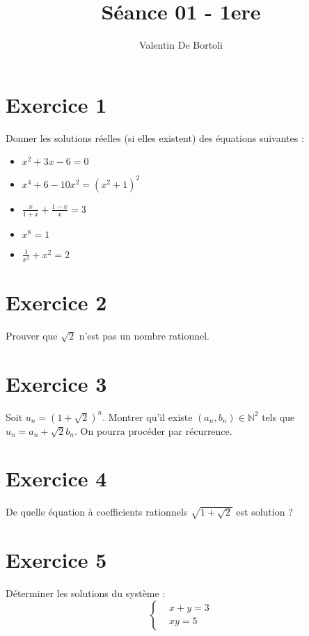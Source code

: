 \documentclass[10pt,a4paper]{article}
\title{Séance 01 - 1ere}
\author{Valentin De Bortoli}
\begin{document}
\maketitle
\section{Exercice 1}
Donner les solutions réelles (si elles existent) des équations
suivantes :
\begin{itemize}
\item $x^2 + 3x -6 = 0$
\item $x^4 + 6 -10x^2 = (x^2+1)^2$
\item $\frac{x}{1+x}  + \frac{1-x}{x} = 3$
\item $x^8 = 1$
\item $\frac{1}{x^2} + x^2 =2$
\end{itemize}

\section{Exercice 2}
Prouver que $\sqrt{2}$ n'est pas un nombre rationnel.

  \section{Exercice 3}
  Soit $u_n = (1 + \sqrt{2})^n$. Montrer qu'il existe $(a_n,b_n) \in
  \mathbb{N}^2$ tels que $u_n = a_n + \sqrt{2} b_n$. On pourra
  procéder par récurrence.

  \section{Exercice 4}
  De quelle équation à coefficients rationnels $\sqrt{1 + \sqrt{2}}$
  est solution ?

  \section{Exercice 5}
  Déterminer les solutions du système :
  \begin{equation*}
    \left\lbrace
      \begin{aligned}
        &x+y = 3 \\
        & xy = 5
    \end{aligned}
    \right.
    \end{equation*}
  
\end{document}
